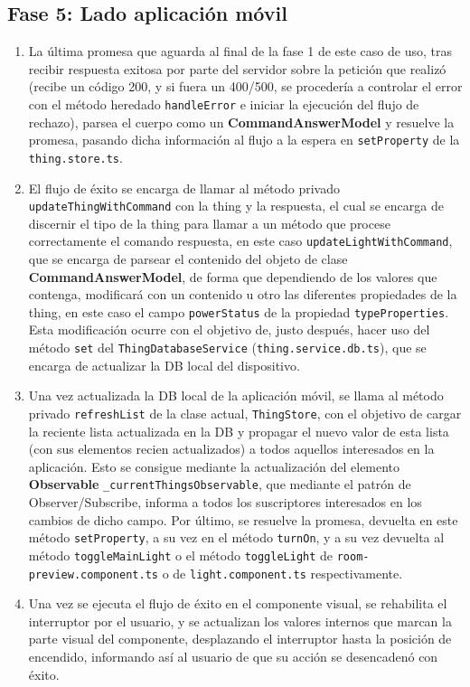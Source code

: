 \subsection{Fase 5: Lado aplicación móvil}
\label{ch:Capitulo5.3.5}
\begin{enumerate}
\item  La última promesa que aguarda al final de la fase 1 de este caso de uso, tras recibir respuesta exitosa por parte del servidor sobre la petición que realizó (recibe un código 200, y si fuera un 400/500, se procedería a controlar el error con el método heredado \verb|handleError| e iniciar la ejecución del flujo de rechazo), parsea el cuerpo como un \textbf{CommandAnswerModel} y resuelve la promesa, pasando dicha información al flujo a la espera en \verb|setProperty| de la \verb|thing.store.ts|.

\item  El flujo de éxito se encarga de llamar al método privado \verb|updateThingWithCommand| con la thing y la respuesta, el cual se encarga de discernir el tipo de la thing para llamar a un método que procese correctamente el comando respuesta, en este caso \verb|updateLightWithCommand|, que se encarga de parsear el contenido del objeto de clase \textbf{CommandAnswerModel}, de forma que dependiendo de los valores que contenga, modificará con un contenido u otro las diferentes propiedades de la thing, en este caso el campo \verb|powerStatus| de la propiedad \verb|typeProperties|. Esta modificación ocurre con el objetivo de, justo después, hacer uso del método \verb|set| del \verb|ThingDatabaseService| (\verb|thing.service.db.ts|), que se encarga de actualizar la DB local del dispositivo.

\item  Una vez actualizada la DB local de la aplicación móvil, se llama al método privado \verb|refreshList| de la clase actual, \verb|ThingStore|, con el objetivo de cargar la reciente lista actualizada en la DB y propagar el nuevo valor de esta lista (con sus elementos recien actualizados) a todos aquellos interesados en la aplicación. Esto se consigue mediante la actualización del elemento \textbf{Observable} \verb|_currentThingsObservable|, que mediante el patrón de Observer/Subscribe, informa a todos los suscriptores interesados en los cambios de dicho campo. Por último, se resuelve la promesa, devuelta en este método \verb|setProperty|, a su vez en el método \verb|turnOn|, y a su vez devuelta al método \verb|toggleMainLight| o el método \verb|toggleLight| de \verb|room-preview.component.ts| o de \verb|light.component.ts| respectivamente.

\item  Una vez se ejecuta el flujo de éxito en el componente visual, se rehabilita el interruptor por el usuario, y se actualizan los valores internos que marcan la parte visual del componente, desplazando el interruptor hasta la posición de encendido, informando así al usuario de que su acción se desencadenó con éxito.
\end{enumerate}

